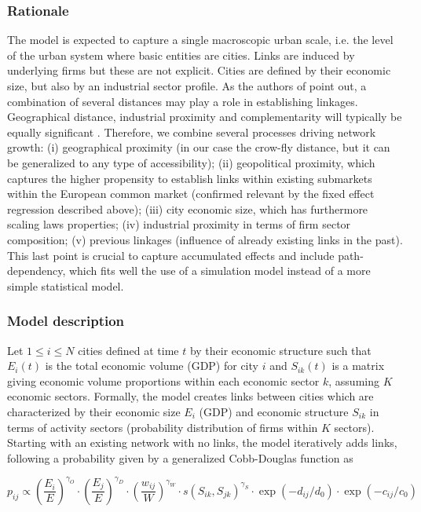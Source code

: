 \documentclass[10pt,letterpaper]{article}
\begin{document}
\subsubsection*{Rationale}

The model is expected to capture a single macroscopic urban scale, i.e. the level of the urban system where basic entities are cities. Links are induced by underlying firms but these are not explicit. Cities are defined by their economic size, but also by an industrial sector profile. As the authors of \cite{martinus2018global} point out, a combination of several distances may play a role in establishing linkages. Geographical distance, industrial proximity and complementarity will typically be equally significant \cite{cottineau2020nested}. Therefore, we combine several processes driving network growth: (i) geographical proximity (in our case the crow-fly distance, but it can be generalized to any type of accessibility); (ii) geopolitical proximity, which captures the higher propensity to establish links within existing submarkets within the European common market (confirmed relevant by the fixed effect regression described above); (iii) city economic size, which has furthermore scaling laws properties; (iv) industrial proximity in terms of firm sector composition; (v) previous linkages (influence of already existing links in the past). This last point is crucial to capture accumulated effects and include path-dependency, which fits well the use of a simulation model instead of a more simple statistical model.


\subsubsection*{Model description}

Let $1 \leq i \leq N$ cities defined at time $t$ by their economic structure such that $E_i(t)$ is the total economic volume (GDP) for city $i$ and $S_{ik}(t)$ is a matrix giving economic volume proportions within each economic sector $k$, assuming $K$ economic sectors. Formally, the model creates links between cities which are characterized by their economic size $E_i$ (GDP) and economic structure $S_{ik}$ in terms of activity sectors (probability distribution of firms within $K$ sectors). Starting with an existing network with no links, the model iteratively adds links, following a probability given by a generalized Cobb-Douglas function \cite{vilcu2011geometric} as 

\begin{equation}
p_{ij} \propto \left(\frac{E_{i}}{E}\right)^{\gamma_O} \cdot \left(\frac{E_{j}}{E}\right)^{\gamma_D} \cdot \left(\frac{w_{ij}}{W}\right)^{\gamma_W} \cdot s\left(S_{ik},S_{jk}\right)^{\gamma_S} \cdot \exp \left(- d_{ij} / d_0\right) \cdot \exp \left(- c_{ij} / c_0\right)
\end{equation}
\end{document}
